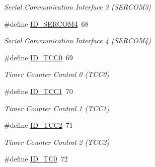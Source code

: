 \begin{DoxyCompactItemize}
\begin{DoxyCompactList}\small\item\em Serial Communication Interface 3 (S\+E\+R\+C\+O\+M3) \end{DoxyCompactList}\item 
\hypertarget{group___s_a_m_l21_g18_a__id_ga270382f699a7cc1580298bc4c32d6ce5}{}\#define \hyperlink{group___s_a_m_l21_g18_a__id_ga270382f699a7cc1580298bc4c32d6ce5}{I\+D\+\_\+\+S\+E\+R\+C\+O\+M4}~68\label{group___s_a_m_l21_g18_a__id_ga270382f699a7cc1580298bc4c32d6ce5}

\begin{DoxyCompactList}\small\item\em Serial Communication Interface 4 (S\+E\+R\+C\+O\+M4) \end{DoxyCompactList}\item 
\hypertarget{group___s_a_m_l21_g18_a__id_gae710608f4c53680eb854f146b8cfd395}{}\#define \hyperlink{group___s_a_m_l21_g18_a__id_gae710608f4c53680eb854f146b8cfd395}{I\+D\+\_\+\+T\+C\+C0}~69\label{group___s_a_m_l21_g18_a__id_gae710608f4c53680eb854f146b8cfd395}

\begin{DoxyCompactList}\small\item\em Timer Counter Control 0 (T\+C\+C0) \end{DoxyCompactList}\item 
\hypertarget{group___s_a_m_l21_g18_a__id_ga3a4b71213e54d4a617589bc14d66502f}{}\#define \hyperlink{group___s_a_m_l21_g18_a__id_ga3a4b71213e54d4a617589bc14d66502f}{I\+D\+\_\+\+T\+C\+C1}~70\label{group___s_a_m_l21_g18_a__id_ga3a4b71213e54d4a617589bc14d66502f}

\begin{DoxyCompactList}\small\item\em Timer Counter Control 1 (T\+C\+C1) \end{DoxyCompactList}\item 
\hypertarget{group___s_a_m_l21_g18_a__id_ga933f0423071b10a976b58a760fa9c2b2}{}\#define \hyperlink{group___s_a_m_l21_g18_a__id_ga933f0423071b10a976b58a760fa9c2b2}{I\+D\+\_\+\+T\+C\+C2}~71\label{group___s_a_m_l21_g18_a__id_ga933f0423071b10a976b58a760fa9c2b2}

\begin{DoxyCompactList}\small\item\em Timer Counter Control 2 (T\+C\+C2) \end{DoxyCompactList}\item 
\hypertarget{group___s_a_m_l21_g18_a__id_ga17a38517c59418d9ed3b113d2d99eb6b}{}\#define \hyperlink{group___s_a_m_l21_g18_a__id_ga17a38517c59418d9ed3b113d2d99eb6b}{I\+D\+\_\+\+T\+C0}~72\label{group___s_a_m_l21_g18_a__id_ga17a38517c59418d9ed3b113d2d99eb6b}


\end{DoxyCompactItemize}
